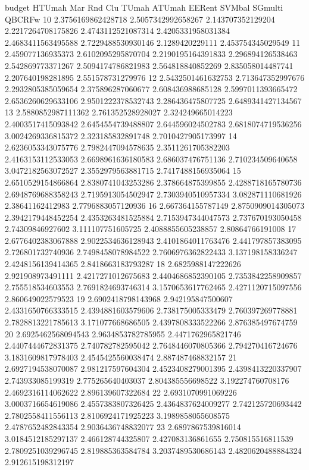 budget HTUmah Mar Rnd Clu TUmah ATUmah EERent SVMbal SGmulti QBCRFw
10 2.3756169862428718 2.5057342992658267 2.143707352129204 2.2217264708175826 2.4743112521087314 2.4205331958031384 2.4683411563495588 2.7229488530930146 2.1289420229111 2.453754345029549
11 2.459077136935373 2.6102095295870704 2.2190195164391833 2.296894126538463 2.542869773371267 2.5094174786821983 2.564818840852269 2.835058014487741 2.207640198281895 2.551578731279976
12 2.5432501461632753 2.713647352997676 2.2932805385059654 2.375896287060677 2.608436988685128 2.5997011393665472 2.6536260629633106 2.9501222378532743 2.286436475807725 2.6489341427134567
13 2.5880852987111362 2.761352528928027 2.324249665014223 2.4003517415093842 2.6454554739488807 2.644596024502783 2.6818074719536256 3.0024269336815372 2.323185832891748 2.7010427905173997
14 2.6236053343075776 2.7982447094578635 2.3511261705382203 2.4163153112533053 2.6698961636180583 2.686037476751136 2.710234509640658 3.0472182563072527 2.3552979563881715 2.7417488156935064
15 2.6510529154866864 2.8380741043253286 2.378664875399855 2.4288718165780736 2.6948769688358243 2.7195913054502947 2.7303940510957334 3.082871110681926 2.38641162412983 2.7796883057120936
16 2.667364155787149 2.8750909014305073 2.3942179448452254 2.4353263481525884 2.7153947344047573 2.737670193050458 2.74309846927602 3.111107751605725 2.4088855605238857 2.80864766191008
17 2.6776402383067888 2.9022534636128943 2.4101864011763476 2.441797857383095 2.726801732740936 2.7498458078984522 2.7606976362822433 3.137198158336247 2.4248156139414365 2.8418663183793287
18 2.6825988147222626 2.921908973491111 2.4217271012675683 2.4404686852390105 2.7353842258909857 2.755518534603553 2.7691824693746314 3.1570653617762465 2.4271120715097556 2.860649022579523
19 2.6902418798143968 2.942195847500607 2.4331650766333515 2.4394881603579606 2.738175005333479 2.760397269778881 2.7828813221785613 3.171077668686505 2.4397808333522266 2.876385497674759
20 2.6925462568094543 2.9634853782785955 2.4471762965821746 2.4407444672831375 2.740782782595042 2.7648446070805366 2.794270416724676 3.1831609817978403 2.4545425560038474 2.887487468832157
21 2.6927194538070087 2.981217597604304 2.4523408279001395 2.4398413220337907 2.743933085199319 2.775265640403037 2.804385556698522 3.192274760708176 2.4692316114062622 2.896139607322684
22 2.6931070991069226 3.0003716654619086 2.4557383807326425 2.4364837624009277 2.742125720693442 2.7802558411556113 2.8106924171925223 3.1989858055608575 2.4787652482843354 2.9036436748832077
23 2.6897867539816014 3.0184512185297137 2.466128744325807 2.427083136861655 2.750815516811539 2.7809251039296745 2.819885363584784 3.2037489530686143 2.4820620488884324 2.912615198312197
